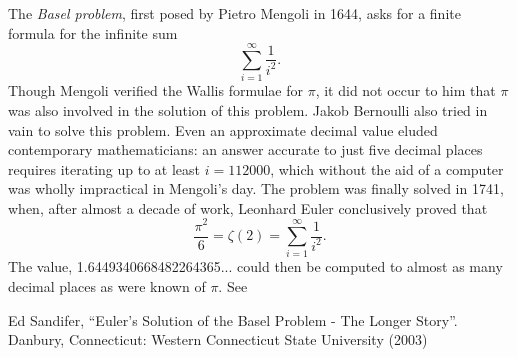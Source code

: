 \documentclass[12pt]{article}
\begin{document}
The {\em Basel problem}, first posed by Pietro Mengoli in 1644, asks for a finite formula for the infinite sum $$\sum_{i = 1}^{\infty} \frac{1}{i^2}.$$ Though Mengoli verified the Wallis formulae for $\pi$, it did not occur to him that $\pi$ was also involved in the solution of this problem. Jakob Bernoulli also tried in vain to solve this problem. Even an approximate decimal value eluded contemporary mathematicians: an answer accurate to just five decimal places requires iterating up to at least $i = 112000$, which without the aid of a computer was wholly impractical in Mengoli's day. The problem was finally solved in 1741, when, after almost a decade of work, Leonhard Euler conclusively proved that $$\frac{\pi^2}{6} = \zeta(2) = \sum_{i = 1}^{\infty}\frac{1}{i^2}.$$ The value, 1.6449340668482264365... could then be computed to almost as many decimal places as were known of $\pi$. See 

\begin{thebibliography}{1}
 Ed Sandifer, ``Euler's Solution of the Basel Problem - The Longer Story''. Danbury, Connecticut: Western Connecticut State University (2003)
\end{thebibliography}
\end{document}
